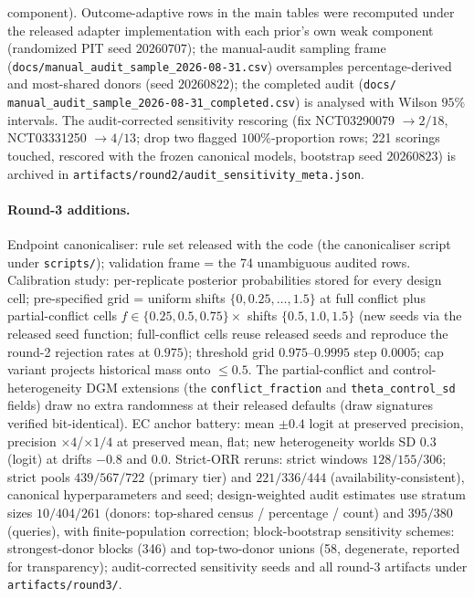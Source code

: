 \documentclass[11pt]{article}
\begin{document}
component). Outcome-adaptive rows in the main tables were recomputed under
the released adapter implementation with each prior's own weak component
(randomized PIT seed $20260707$); the manual-audit sampling frame
(\texttt{docs/\allowbreak manual\_audit\_sample\_2026-08-31.csv}) oversamples
percentage-derived and most-shared donors (seed $20260822$); the completed
audit (\texttt{docs/} \texttt{manual\_audit\_sample\_2026-08-31\_completed.csv})
is analysed with Wilson $95\%$ intervals. The audit-corrected
sensitivity rescoring (fix
NCT03290079 $\to 2/18$, NCT03331250 $\to 4/13$;
drop two flagged $100\%$-proportion rows; 221 scorings touched, rescored
with the frozen canonical models, bootstrap seed $20260823$) is archived in
\texttt{artifacts/\allowbreak round2/audit\_sensitivity\_meta.json}.

\paragraph{Round-3 additions.} Endpoint canonicaliser: rule set released
with the code (the canonicaliser script under \texttt{scripts/});
validation frame =
the 74 unambiguous audited rows. Calibration study: per-replicate posterior
probabilities stored for every design cell; pre-specified grid = uniform
shifts $\{0,0.25,\dots,1.5\}$ at full conflict plus partial-conflict cells
$f\in\{0.25,0.5,0.75\}\times$ shifts $\{0.5,1.0,1.5\}$ (new seeds via the
released seed function; full-conflict cells reuse released seeds and
reproduce the round-2 rejection rates at $0.975$); threshold grid
$0.975$--$0.9995$ step $0.0005$; cap variant projects historical mass onto
$\le 0.5$. The partial-conflict and control-heterogeneity DGM extensions
(the \texttt{conflict\_fraction} and \texttt{theta\_control\_sd} fields)
draw no extra
randomness at their released defaults (draw signatures verified
bit-identical). EC anchor battery: mean $\pm0.4$ logit at preserved
precision, precision $\times4$/$\times1/4$ at preserved mean, flat; new
heterogeneity worlds SD $0.3$ (logit) at drifts $-0.8$ and $0.0$. Strict-ORR
reruns: strict windows $128/155/306$; strict pools $439/567/722$ (primary
tier) and $221/336/444$ (availability-consistent), canonical
hyperparameters and seed; design-weighted audit estimates use stratum sizes
$10/404/261$ (donors: top-shared census / percentage / count) and
$395/380$ (queries), with finite-population correction; block-bootstrap
sensitivity schemes: strongest-donor blocks (346) and top-two-donor unions
(58, degenerate, reported for transparency); audit-corrected sensitivity
seeds and all round-3 artifacts under
\texttt{artifacts/\allowbreak round3/}.
\end{document}
